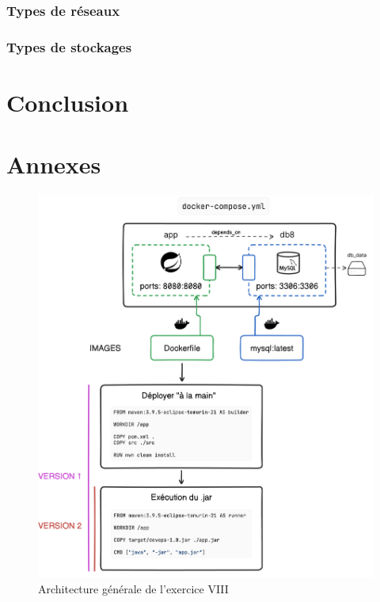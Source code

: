 \subsubsection*{Types de réseaux}
\subsubsection*{Types de stockages}

\section{Conclusion}

\section{Annexes}

\begin{figure}[hbtp]
    \centering
    \includegraphics[width=\textwidth]{images/exo8.png}
    \caption{Architecture générale de l'exercice VIII}
    \label{fig:exo8}
\end{figure}